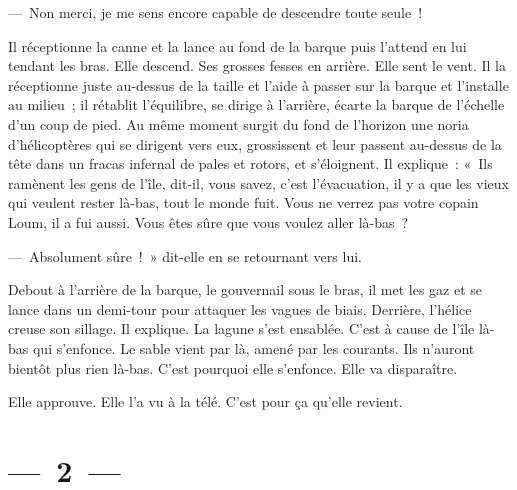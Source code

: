\documentclass[french,twoside]{book} %
\begin{document}
— Non merci, je me sens encore capable de descendre toute seule !\par
Il réceptionne la canne et la lance au fond de la barque puis l’attend en lui tendant les bras. Elle descend. Ses grosses fesses en arrière. Elle sent le vent. Il la réceptionne juste au-dessus de la taille et l’aide à passer sur la barque et l’installe au milieu ; il rétablit l’équilibre, se dirige à l’arrière, écarte la barque de l’échelle d’un coup de pied. Au même moment surgit du fond de l’horizon une noria d’hélicoptères qui se dirigent vers eux, grossissent et leur passent au-dessus de la tête dans un fracas infernal de pales et rotors, et s’éloignent. Il explique : « Ils ramènent les gens de l’île, dit-il, vous savez, c’est l’évacuation, il y a que les vieux qui veulent rester là-bas, tout le monde fuit. Vous ne verrez pas votre copain Loum, il a fui aussi. Vous êtes sûre que vous voulez aller là-bas ?\par
— Absolument sûre ! » dit-elle en se retournant vers lui.\par
Debout à l’arrière de la barque, le gouvernail sous le bras, il met les gaz et se lance dans un demi-tour pour attaquer les vagues de biais. Derrière, l’hélice creuse son sillage. Il explique. La lagune s’est ensablée. C’est à cause de l’île là-bas qui s’enfonce. Le sable vient par là, amené par les courants. Ils n’auront bientôt plus rien là-bas. C’est pourquoi elle s’enfonce. Elle va disparaître.\par
Elle approuve. Elle l’a vu à la télé. C’est pour ça qu’elle revient.

\section[{— 2 —}]{— 2 —}
\renewcommand{\leftmark}{— 2 —}
\end{document}
